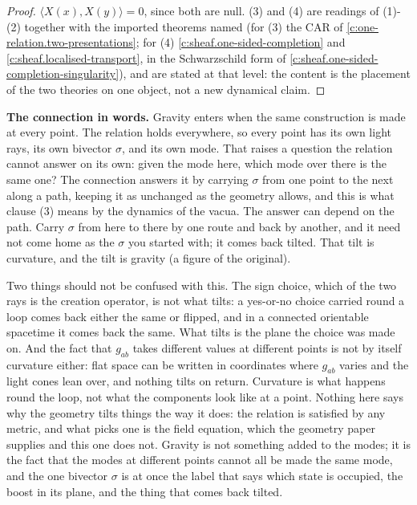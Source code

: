 \documentclass[11pt]{article}
\theoremstyle{definition}
\theoremstyle{plain}
\providecommand{\ip}{}\renewcommand{\ip}[2]{\langle #1, #2\rangle}
\begin{document}
\begin{proof}
$\ip{X(x)}{X(y)} = 0$, since both are null. (3) and (4) are readings of (1)-(2) together with the imported theorems named (for (3) the CAR of \ref{c:one-relation.two-presentations}; for (4) \ref{c:sheaf.one-sided-completion} and \ref{c:sheaf.localised-transport}, in the Schwarzschild form of \ref{c:sheaf.one-sided-completion-singularity}), and are stated at that level: the content is the placement of the two theories on one object, not a new dynamical claim.

\end{proof}

\label{c:note.one-relation.setting-spacetime-manifold-vacuum-lines}
\textbf{The connection in words.} Gravity enters when the same construction is made at every point. The relation holds everywhere, so every point has its own light rays, its own bivector $\sigma$, and its own mode. That raises a question the relation cannot answer on its own: given the mode here, which mode over there is the same one? The connection answers it by carrying $\sigma$ from one point to the next along a path, keeping it as unchanged as the geometry allows, and this is what clause (3) means by the dynamics of the vacua. The answer can depend on the path. Carry $\sigma$ from here to there by one route and back by another, and it need not come home as the $\sigma$ you started with; it comes back tilted. That tilt is curvature, and the tilt is gravity (a figure of the original).

Two things should not be confused with this. The sign choice, which of the two rays is the creation operator, is not what tilts: a yes-or-no choice carried round a loop comes back either the same or flipped, and in a connected orientable spacetime it comes back the same. What tilts is the plane the choice was made on. And the fact that $g_{ab}$ takes different values at different points is not by itself curvature either: flat space can be written in coordinates where $g_{ab}$ varies and the light cones lean over, and nothing tilts on return. Curvature is what happens round the loop, not what the components look like at a point. Nothing here says why the geometry tilts things the way it does: the relation is satisfied by any metric, and what picks one is the field equation, which the geometry paper supplies \cite[Thm.~4.5]{ButlerT6} and this one does not. Gravity is not something added to the modes; it is the fact that the modes at different points cannot all be made the same mode, and the one bivector $\sigma$ is at once the label that says which state is occupied, the boost in its plane, and the thing that comes back tilted.
\end{document}
